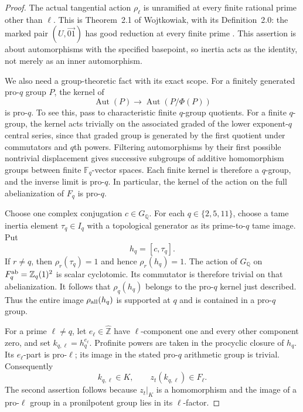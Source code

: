 \begin{proof}
The actual tangential action $\rho_\ell$ is unramified at
every finite rational prime other than $\ell$.  This is
Theorem~2.1 of Wojtkowiak, with its Definition~2.0: the
marked pair $(U,\overrightarrow{01})$ has good reduction
at every finite prime \cite[pp.198--200]{AuditWojtkowiak2007}.
This assertion is about automorphisms with the specified
basepoint, so inertia acts as the identity, not merely as
an inner automorphism.

We also need a group-theoretic fact with its exact scope.
For a finitely generated pro-$q$ group $P$, the kernel of
\[
       \operatorname{Aut}(P)\longrightarrow
                         \operatorname{Aut}(P/\Phi(P))
\]
is pro-$q$.  To see this, pass to characteristic finite
$q$-group quotients.  For a finite $q$-group, the kernel
acts trivially on the associated graded of the lower
exponent-$q$ central series, since that graded group is
generated by the first quotient under commutators and
$q$th powers.  Filtering automorphisms by their first
possible nontrivial displacement gives successive
subgroups of additive homomorphism groups between finite
$\mathbb F_q$-vector spaces.  Each finite kernel is
therefore a $q$-group, and the inverse limit is pro-$q$.
In particular, the kernel of the action on the full
abelianization of $F_q$ is pro-$q$.

Choose one complex conjugation $c\in G_{\mathbb Q}$.
For each $q\in\{2,5,11\}$, choose a tame inertia element
$\tau_q\in I_q$ with a topological generator as its
prime-to-$q$ tame image.  Put
\[
                         h_q=[c,\tau_q].
\]
If $r\ne q$, then $\rho_r(\tau_q)=1$ and hence
$\rho_r(h_q)=1$.  The action of $G_{\mathbb Q}$ on
$F_q^{\rm ab}=\mathbb Z_q(1)^2$ is scalar cyclotomic.
Its commutator is therefore trivial on that
abelianization.  It follows that $\rho_q(h_q)$ belongs
to the pro-$q$ kernel just described.  Thus the entire
image $\rho_{\rm all}(h_q)$ is supported at $q$ and is
contained in a pro-$q$ group.

For a prime $\ell\ne q$, let $e_\ell\in\widehat{\mathbb Z}$
have $\ell$-component one and every other component zero,
and set $k_{q,\ell}=h_q^{e_\ell}$.  Profinite powers are
taken in the procyclic closure of $h_q$.  Its
$e_\ell$-part is pro-$\ell$; its image in the stated
pro-$q$ arithmetic group is trivial.  Consequently
\[
              k_{q,\ell}\in K,\qquad
              z_t(k_{q,\ell})\in F_\ell.               \tag{E.127.5}
\]
The second assertion follows because $z_t|_K$ is a
homomorphism and the image of a pro-$\ell$ group in a
pronilpotent group lies in its $\ell$-factor.


\end{proof}
